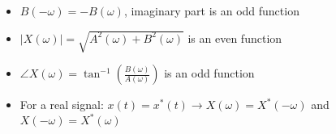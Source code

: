 \begin{itemize}
\begin{itemize}
      \item $B(-\omega)=-B(\omega)$, imaginary part is an odd function

      \item $|X(\omega)|=\sqrt{A^2(\omega)+B^2(\omega)}$ is an even function

      \item $\angle X(\omega)=\tan^{-1}\left( \frac{B(\omega)}{A(\omega)} \right)$ is an odd function

      \item For a real signal: $x(t)=x^*(t)\to X(\omega)=X^*(-\omega)$ and $X(-\omega)=X^*(\omega)$

    \end{itemize}

\end{itemize}



